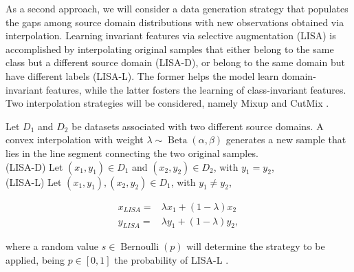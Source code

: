 As a second approach, we will consider a data generation strategy
that populates the gaps among source domain distributions with new 
observations obtained via interpolation. Learning invariant
features via selective augmentation (LISA) is accomplished by interpolating 
original samples that either belong to the same class but a 
different source domain (LISA-D), or belong to the same domain but have 
different labels (LISA-L). 
The former helps the model learn domain-invariant features, while the latter
fosters the learning of class-invariant features. Two interpolation
strategies will be considered, namely Mixup 
\cite{zhangMixupEmpiricalRisk2018}
and CutMix
\cite{yunCutMixRegularizationStrategy2019}.

\begin{definition}
    Let $D_1$ and $D_2$ be datasets associated with two different source domains.
    A convex interpolation with weight $\lambda \sim \operatorname{Beta}(\alpha, \beta)$ 
    generates a new sample that lies in the 
    line segment connecting the two original samples. \\

    \vspace{-3.0mm}
    (LISA-D) Let $(x_1, y_1) \in D_1$ and $(x_2, y_2) \in D_2$, with $y_1 = y_2$, \\
    (LISA-L) Let $(x_1, y_1), (x_2, y_2) \in D_1$, with $y_1 \neq y_2$,
    \vspace{-1.0mm}

    $$
        \begin{aligned}
            x_{LISA} = & \lambda x_1 + (1 - \lambda) x_2 \\
            y_{LISA} = & \lambda y_1 + (1 - \lambda) y_2,
        \end{aligned}
    $$

    where a random value $s \in \operatorname{Bernoulli}(p)$ will determine
    the strategy to be applied, being $p \in [0,1]$ the probability of LISA-L
    \cite{yaoImprovingOutofDistributionRobustness2022}.
\end{definition}


